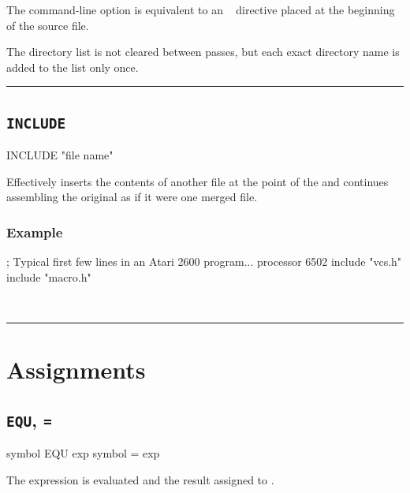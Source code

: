 The command-line option  is equivalent to an ~ directive placed at the beginning of the source file.

The directory list is not cleared between passes, but each exact directory name is added to the list only once.
\\
\hrule
\subsection{\texttt{INCLUDE}}
\label{pseudoop:include}


\begin{usage}
  INCLUDE "file name"
\end{usage}

Effectively inserts the contents of another file at the point of the  and continues assembling the original as if it were one merged file.

\subsubsection{Example}

\begin{code}[caption=Declaring the Platform]
; Typical first few lines in an Atari 2600 program...
   processor 6502
   include "vcs.h"
   include "macro.h"
\end{code}\\

\hrule

\section{Assignments}

\subsection{\texttt{EQU}, \texttt{=}}
\label{pseudoop:equ}
\label{pseudoop:=}


\begin{usage}
symbol EQU exp
symbol = exp
\end{usage}

The expression is evaluated and the result assigned to
.

